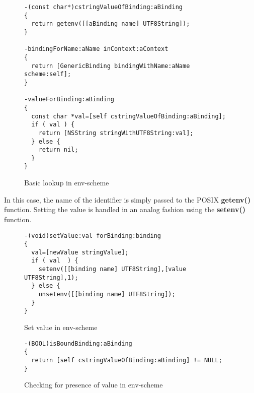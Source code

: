 \documentclass[preprint,authoryear]{acm_proc_article-sp}
\begin{document}
     
\begin{figure}[htbp]
\begin{center}
\begin{small}
\begin{verbatim}
-(const char*)cstringValueOfBinding:aBinding
{
  return getenv([[aBinding name] UTF8String]);
}

-bindingForName:aName inContext:aContext
{
  return [GenericBinding bindingWithName:aName scheme:self];
}

-valueForBinding:aBinding
{
  const char *val=[self cstringValueOfBinding:aBinding];
  if ( val ) {
    return [NSString stringWithUTF8String:val];
  } else {
    return nil;
  }
}
\end{verbatim}
\end{small}
\caption{Basic lookup in env-scheme}
\label{get-env}
\end{center}
\end{figure}

In this case, the name of the identifier is simply passed to the POSIX {\bf getenv()} function.
Setting the value is handled in an analog fashion using the {\bf setenv()} function.

\begin{figure}[htbp]
\begin{center}
\begin{small}
\begin{verbatim}
-(void)setValue:val forBinding:binding
{
  val=[newValue stringValue];
  if ( val  ) {
    setenv([[binding name] UTF8String],[value UTF8String],1);
  } else {
    unsetenv([[binding name] UTF8String]);
  }
}
\end{verbatim}
\end{small}
\caption{Set value in env-scheme}
\label{setvalue-env}
\end{center}
\end{figure}

\begin{figure}[htbp]
\begin{center}
\begin{small}
\begin{verbatim}
-(BOOL)isBoundBinding:aBinding
{
  return [self cstringValueOfBinding:aBinding] != NULL;
}
\end{verbatim}
\end{small}
\caption{Checking for presence of value in env-scheme}
\label{hasValue-env}
\end{center}
\end{figure}
\end{document}
